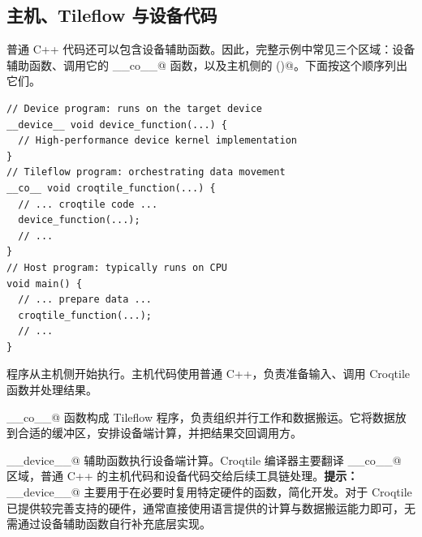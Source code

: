 \subsection*{主机、Tileflow 与设备代码}

普通 C++ 代码还可以包含设备辅助函数。因此，完整示例中常见三个区域：设备辅助函数、调用它的 \co@__co__@ 函数，以及主机侧的 \co@main()@。下面按这个顺序列出它们。

\begin{lstlisting}[language=croqtile,caption={单份源文件中的三个区域}]
// Device program: runs on the target device
__device__ void device_function(...) {
  // High-performance device kernel implementation
}
// Tileflow program: orchestrating data movement
__co__ void croqtile_function(...) {
  // ... croqtile code ...
  device_function(...);
  // ...
}
// Host program: typically runs on CPU
void main() {
  // ... prepare data ...
  croqtile_function(...);
  // ...
}
\end{lstlisting}

程序从主机侧开始执行。主机代码使用普通 C++，负责准备输入、调用 Croqtile 函数并处理结果。

\co@__co__@ 函数构成 Tileflow 程序，负责组织并行工作和数据搬运。它将数据放到合适的缓冲区，安排设备端计算，并把结果交回调用方。

\co@__device__@ 辅助函数执行设备端计算。Croqtile 编译器主要翻译 \co@__co__@ 区域，普通 C++ 的主机代码和设备代码交给后续工具链处理。\newline{}\newline{}\textbf{提示：} \co@__device__@ 主要用于在必要时复用特定硬件的函数，简化开发。对于 Croqtile 已提供较完善支持的硬件，通常直接使用语言提供的计算与数据搬运能力即可，无需通过设备辅助函数自行补充底层实现。
